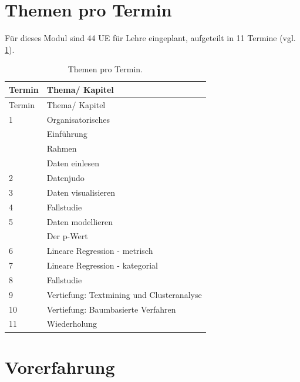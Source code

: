\documentclass[12pt,ngerman,]{book}
\begin{document}
\section{Themen pro Termin}\label{themen-pro-termin}

Für dieses Modul sind 44 UE für Lehre eingeplant, aufgeteilt in 11
Termine (vgl. \ref{tab:Themen}).

\begin{longtable}[]{@{}ll@{}}
\caption{\label{tab:Themen} Themen pro Termin.}\tabularnewline
\toprule
Termin & Thema/ Kapitel\tabularnewline
\midrule
\endfirsthead
\toprule
Termin & Thema/ Kapitel\tabularnewline
\midrule
\endhead
1 & Organisatorisches\tabularnewline
\begin{minipage}[t]{0.48\columnwidth}\raggedright\strut
\strut
\end{minipage} & \begin{minipage}[t]{0.48\columnwidth}\raggedright\strut
Einführung\strut
\end{minipage}\tabularnewline
\begin{minipage}[t]{0.48\columnwidth}\raggedright\strut
\strut
\end{minipage} & \begin{minipage}[t]{0.48\columnwidth}\raggedright\strut
Rahmen\strut
\end{minipage}\tabularnewline
\begin{minipage}[t]{0.48\columnwidth}\raggedright\strut
\strut
\end{minipage} & \begin{minipage}[t]{0.48\columnwidth}\raggedright\strut
Daten einlesen\strut
\end{minipage}\tabularnewline
2 & Datenjudo\tabularnewline
3 & Daten visualisieren\tabularnewline
4 & Fallstudie\tabularnewline
5 & Daten modellieren\tabularnewline
\begin{minipage}[t]{0.48\columnwidth}\raggedright\strut
\strut
\end{minipage} & \begin{minipage}[t]{0.48\columnwidth}\raggedright\strut
Der p-Wert\strut
\end{minipage}\tabularnewline
6 & Lineare Regression - metrisch\tabularnewline
7 & Lineare Regression - kategorial\tabularnewline
8 & Fallstudie\tabularnewline
9 & Vertiefung: Textmining und Clusteranalyse\tabularnewline
10 & Vertiefung: Baumbasierte Verfahren\tabularnewline
11 & Wiederholung\tabularnewline
\bottomrule
\end{longtable}

\section{Vorerfahrung}\label{vorerfahrung}
\end{document}
